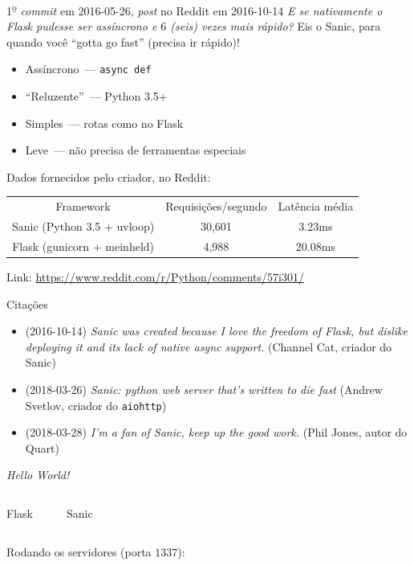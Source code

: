 \documentclass[utf8]{beamer}
\begin{document}
\begin{frame}{1\textsuperscript{\b{o}} \emph{commit} em 2016-05-26,
              \emph{post} no Reddit em 2016-10-14}
  \emph{E se nativamente o Flask pudesse ser assíncrono
        e $6$ (seis) vezes mais rápido?}
  \vfill
  Eis o Sanic, para quando você ``gotta go fast''
  (precisa ir rápido)!
  \begin{itemize}
    \item Assíncrono~--- \texttt{async def}
    \item ``Reluzente''~--- Python 3.5+
    \item Simples~--- rotas como no Flask
    \item Leve~--- não precisa de ferramentas especiais
  \end{itemize}
  \vfill
  Dados fornecidos pelo criador, no Reddit:
  {\fontsize{9pt}{11pt}\selectfont
    \begin{tabu} to \textwidth {ccc}
      Framework & Requisições/segundo & Latência média \\
      Sanic (Python 3.5 + uvloop) & 30,601 & 3.23ms \\
      Flask (gunicorn + meinheld) & 4,988 & 20.08ms \\
    \end{tabu}
  }
  \vfill
  Link: \url{https://www.reddit.com/r/Python/comments/57i301/}
\end{frame}


\begin{frame}{Citações}
  \begin{itemize}
    \item (2016-10-14)
      \emph{Sanic was created because I love the freedom of Flask,
            but dislike deploying it
            and its lack of native async support.}
      (Channel Cat, criador do Sanic)

    \item (2018-03-26)
      \emph{Sanic: python web server that's written to die fast}
      (Andrew Svetlov, criador do \texttt{aiohttp})

    \item (2018-03-28)
      \emph{I'm a fan of Sanic, keep up the good work.}
      (Phil Jones, autor do Quart)
  \end{itemize}
\end{frame}


\begin{frame}[fragile]{\emph{Hello World!}}
  \begin{columns}[t]
    Flask\inputminted{python}{01_flask.py}
    Sanic\inputminted{python}{01_sanic.py}
  \end{columns}
  \vfill
  Rodando os servidores (porta $1337$):
  \inputminted{shell}{01_run.sh}
\end{frame}
\end{document}
